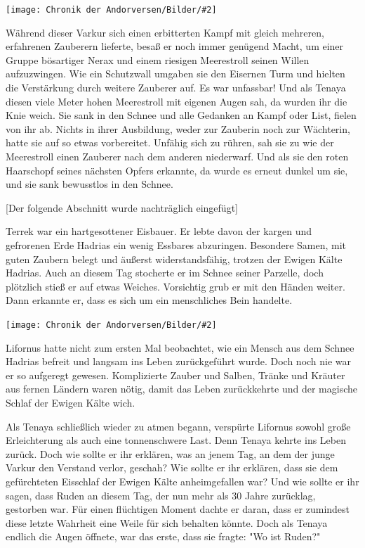 \documentclass[10pt, a4paper, oneside]{book}
\newcommand{\bildmitts}[2][height=0.32\textwidth,width=0.48\textwidth,keepaspectratio]{%
    \begin{center}
        \texttt{[image: Chronik der Andorversen/Bilder/\#2]}
    \end{center}
}
\begin{document}
\begin{multicols}{2}
\bildmitts{Tenaya die Wächterin des Feuers Bild 2.jpg}

Während dieser Varkur sich einen erbitterten Kampf mit gleich mehreren, erfahrenen Zauberern lieferte, besaß er noch immer genügend Macht, um einer Gruppe bösartiger Nerax und einem riesigen Meerestroll seinen Willen aufzuzwingen. Wie ein Schutzwall umgaben sie den Eisernen Turm und hielten die Verstärkung durch weitere Zauberer auf. Es war unfassbar!
Und als Tenaya diesen viele Meter hohen Meerestroll mit eigenen Augen sah, da wurden ihr die Knie weich. Sie sank in den Schnee und alle Gedanken an Kampf oder List, fielen von ihr ab. Nichts in ihrer Ausbildung, weder zur Zauberin noch zur Wächterin, hatte sie auf so etwas vorbereitet. Unfähig sich zu rühren, sah sie zu wie der Meerestroll einen Zauberer nach dem anderen niederwarf. Und als sie den roten Haarschopf seines nächsten Opfers erkannte, da wurde es erneut dunkel um sie, und sie sank bewusstlos in den Schnee.

[Der folgende Abschnitt wurde nachträglich eingefügt]

Terrek war ein hartgesottener Eisbauer. Er lebte davon der kargen und gefrorenen Erde Hadrias ein wenig Essbares abzuringen. Besondere Samen, mit guten Zaubern belegt und äußerst widerstandsfähig, trotzen der Ewigen Kälte Hadrias.
Auch an diesem Tag stocherte er im Schnee seiner Parzelle, doch plötzlich stieß er auf etwas Weiches. Vorsichtig grub er mit den Händen weiter. Dann erkannte er, dass es sich um ein menschliches Bein handelte.

\bildmitts{Tenaya die Wächterin des Feuers Bild 3.jpg}

Lifornus hatte nicht zum ersten Mal beobachtet, wie ein Mensch aus dem Schnee Hadrias befreit und langsam ins Leben zurückgeführt wurde. Doch noch nie war er so aufgeregt gewesen. Komplizierte Zauber und Salben, Tränke und Kräuter aus fernen Ländern waren nötig, damit das Leben zurückkehrte und der magische Schlaf der Ewigen Kälte wich.

Als Tenaya schließlich wieder zu atmen begann, verspürte Lifornus sowohl große Erleichterung als auch eine tonnenschwere Last. Denn Tenaya kehrte ins Leben zurück. Doch wie sollte er ihr erklären, was an jenem Tag, an dem der junge Varkur den Verstand verlor, geschah? Wie sollte er ihr erklären, dass sie dem gefürchteten Eisschlaf der Ewigen Kälte anheimgefallen war? Und wie sollte er ihr sagen, dass Ruden an diesem Tag, der nun mehr als 30 Jahre zurücklag, gestorben war. Für einen flüchtigen Moment dachte er daran, dass er zumindest diese letzte Wahrheit eine Weile für sich behalten könnte. Doch als Tenaya endlich die Augen öffnete, war das erste, dass sie fragte: "Wo ist Ruden?"


\end{multicols}
\end{document}
